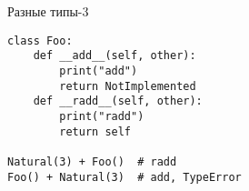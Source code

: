 \begin{frame}[fragile]{Разные типы-3}
\begin{verbatim}
class Foo:
    def __add__(self, other):
        print("add")
        return NotImplemented
    def __radd__(self, other):
        print("radd")
        return self

Natural(3) + Foo()  # radd
Foo() + Natural(3)  # add, TypeError
\end{verbatim}
\end{frame}
